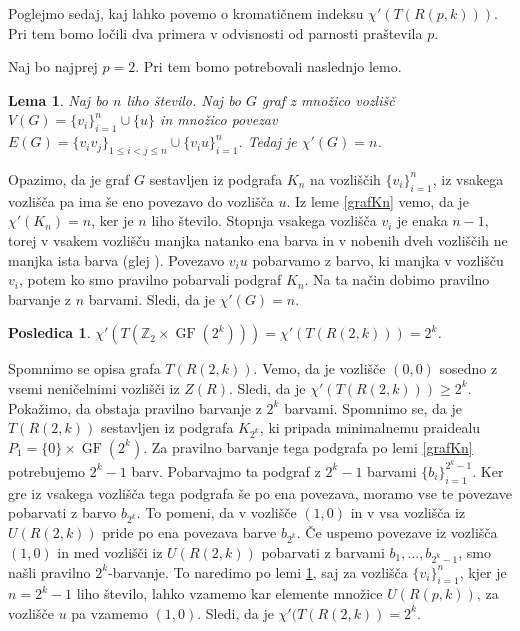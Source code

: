 \documentclass[a4paper, 12pt]{amsart}
\theoremstyle{definition} %
\theoremstyle{plain} %
\newtheorem{lema}[definicija]{Lema}
\newtheorem{posledica}[definicija]{Posledica}
\newcommand{\Z}{\mathbb Z}
\DeclareMathOperator{\GF}{GF}
\begin{document}
Poglejmo sedaj, kaj lahko povemo o kromatičnem indeksu $\chi'(T(R(p,k)))$.  Pri tem bomo ločili dva primera v odvisnosti od parnosti praštevila $p$.

Naj bo najprej $p=2$. Pri tem bomo potrebovali naslednjo lemo.

\begin{lema}
\label{nLihoStozecKn}
Naj bo $n$ liho število. Naj bo $G$ graf z množico vozlišč $V(G) = \{v_i\}_{i=1}^n \cup \{u\}$ in množico povezav $E(G) = \{v_i v_j\}_{1\le i < j\le n} \cup \{v_i u\}_{i=1}^n$. Tedaj je $\chi'(G) = n$.
\end{lema}

\proof
Opazimo, da je graf $G$ sestavljen iz podgrafa $K_n$ na vozliščih $\{v_i\}_{i=1}^n$, iz vsakega vozlišča pa ima še eno povezavo do vozlišča $u$. Iz leme \ref{grafKn} vemo, da je $\chi'(K_n)  = n$, ker je $n$ liho število. Stopnja vsakega vozlišča $v_i$ je enaka $n-1$, torej v vsakem vozlišču manjka natanko ena barva in v nobenih dveh vozliščih ne manjka ista barva (glej \cite{diploma}). Povezavo $v_i u$ pobarvamo z barvo, ki manjka v vozlišču $v_i$, potem ko smo pravilno pobarvali podgraf $K_n$. Na ta način dobimo pravilno barvanje z $n$ barvami. Sledi, da je $\chi'(G) = n$.
\endproof

\begin{posledica}
\label{barvanjeT(R(2,k))}
$\chi'(T(\Z_2 \times \GF(2^k))) = \chi'(T(R(2,k))) = 2^k$.
\end{posledica}

\proof
Spomnimo se opisa grafa $T(R(2,k))$. Vemo, da je vozlišče $(0,0)$ sosedno z vsemi neničelnimi vozlišči iz $Z(R)$. Sledi, da je $\chi'(T(R(2,k))) \ge 2^k$. Pokažimo, da obstaja pravilno barvanje z $2^k$ barvami. Spomnimo se, da je $T(R(2,k))$ sestavljen iz podgrafa $K_{2^k}$, ki pripada minimalnemu praidealu $P_1 = \{0\} \times \GF(2^k)$. Za pravilno barvanje tega podgrafa po lemi \ref{grafKn} potrebujemo $2^k - 1$ barv. Pobarvajmo ta podgraf z $2^k - 1 $ barvami $\{b_i\}_{i=1}^{2^k - 1}$. Ker gre iz vsakega vozlišča tega podgrafa še po ena povezava, moramo vse te povezave pobarvati z barvo $b_{2^k}$. To pomeni, da v vozlišče $(1,0)$ in v vsa vozlišča iz $U(R(2,k))$ pride po ena povezava barve $b_{2^k}$. Če uspemo povezave iz vozlišča $(1,0)$ in med vozlišči iz $U(R(2,k))$ pobarvati z barvami $b_1,\dots, b_{2^k -1}$, smo našli pravilno $2^k$-barvanje. To naredimo po lemi \ref{nLihoStozecKn}, saj za vozlišča $\{v_i\}_{i=1}^n$, kjer je $n=2^k -1$ liho število, lahko vzamemo kar elemente množice $U(R(p,k))$, za vozlišče $u$ pa vzamemo $(1,0)$.  Sledi, da je $\chi'(T(R(2,k)) = 2^k$.
\endproof
\end{document}
